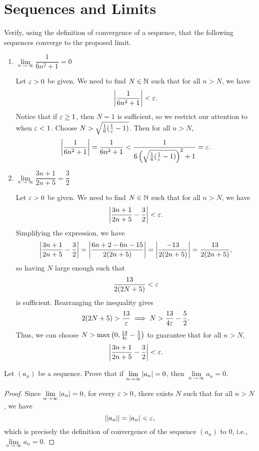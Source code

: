 \section{Sequences and Limits}

\begin{problem}
  Verify, using the definition of convergence of a sequence, that the following
  sequences converge to the proposed limit.

  \begin{enumerate}[label=(\alph*)]
    \item $\lim\limits_{n \to \infty} \dfrac{1}{6n^{2} + 1} = 0$

      Let $\varepsilon > 0$ be given. We need to find $N \in \mathbb{N}$ such that for all $n > N$, we have 
      \[
        \left\lvert \frac{1}{6n^{2} + 1} \right\rvert < \varepsilon.
      \]
      Notice that if $\varepsilon \geq 1$, then $N = 1$ is sufficient, so we restrict our attention to when $\varepsilon < 1$.
      Choose $N > \sqrt{\frac{1}{6}(\frac{1}{\varepsilon} - 1)}$. Then for all $n > N$,
      \[
        \left\lvert \frac{1}{6n^{2} + 1} \right\rvert = \frac{1}{6n^{2} + 1} < \frac{1}{6 \left( \sqrt{\frac{1}{6}(\frac{1}{\varepsilon} - 1)} \right)^{2} + 1} = \varepsilon.
      \]

    \item $\lim\limits_{n \to \infty} \dfrac{3n + 1}{2n + 5} = \dfrac{3}{2}$

      Let $\varepsilon > 0$ be given. We need to find $N \in \mathbb{N}$ such that for all $n > N$, we have 
      \[
        \left\lvert \frac{3n + 1}{2n + 5} - \frac{3}{2} \right\rvert < \varepsilon.
      \]
      Simplifying the expression, we have
      \[
        \left\lvert \frac{3n + 1}{2n + 5} - \frac{3}{2} \right\rvert = \left\lvert \frac{6n + 2 - 6n - 15}{2(2n + 5)} \right\rvert = \left\lvert \frac{-13}{2(2n + 5)} \right\rvert = \frac{13}{2(2n + 5)},
      \]
      so having $N$ large enough such that
      \[
        \frac{13}{2(2N + 5)} < \varepsilon
      \]
      is sufficient. Rearranging the inequality gives 
      \[
        2(2N + 5) > \frac{13}{\varepsilon} \implies N > \frac{13}{4\varepsilon} - \frac{5}{2}.
      \]
      Thus, we can choose $N > \max\left(0, \frac{13}{4\varepsilon} - \frac{5}{2}\right)$ to 
      guarantee that for all $n > N$,
      \[
        \left\lvert \frac{3n + 1}{2n + 5} - \frac{3}{2} \right\rvert < \varepsilon.
      \]
  \end{enumerate}

\end{problem}

\begin{problem}
  Let $(a_{n})$ be a sequence. Prove that if $\lim\limits_{n \to \infty} \left\lvert a_{n} \right\rvert = 0$, 
  then $\lim\limits_{n \to \infty} a_{n} = 0$.

  \begin{proof}
    Since $\lim\limits_{n \to \infty} \left\lvert a_{n} \right\rvert = 0$, for every $\varepsilon > 0$, there exists $N$ 
    such that for all $n > N$, we have
    \[
      \left\lvert  \left\lvert  a_{n}  \right\rvert  \right\rvert = \left\lvert a_{n} \right\rvert < \varepsilon,
    \]
    which is precisely the definition of convergence of the sequence $(a_{n})$ to $0$, i.e., 
    $\lim\limits_{n \to \infty} a_{n} = 0$.
  \end{proof}

\end{problem}

